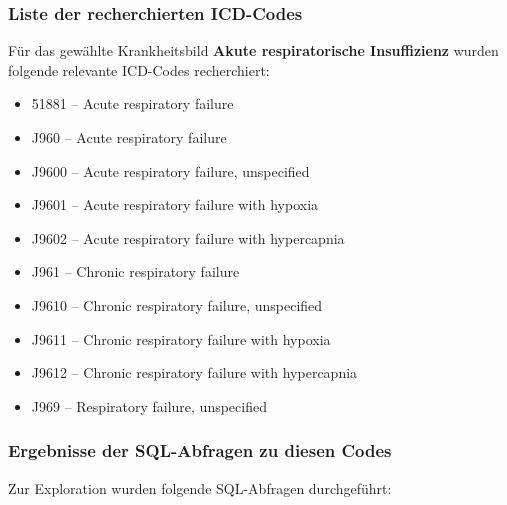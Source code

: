 \documentclass[12pt]{article}
\begin{document}
\subsubsection{Liste der recherchierten ICD-Codes}
Für das gewählte Krankheitsbild \textbf{Akute respiratorische Insuffizienz} wurden folgende relevante ICD-Codes recherchiert:

\begin{itemize}
    \item 51881 – Acute respiratory failure
    \item J960 – Acute respiratory failure
    \item J9600 – Acute respiratory failure, unspecified
    \item J9601 – Acute respiratory failure with hypoxia
    \item J9602 – Acute respiratory failure with hypercapnia
    \item J961 – Chronic respiratory failure
    \item J9610 – Chronic respiratory failure, unspecified
    \item J9611 – Chronic respiratory failure with hypoxia
    \item J9612 – Chronic respiratory failure with hypercapnia
    \item J969 – Respiratory failure, unspecified
\end{itemize}

\subsubsection{Ergebnisse der SQL-Abfragen zu diesen Codes}

Zur Exploration wurden folgende SQL-Abfragen durchgeführt:
\end{document}
